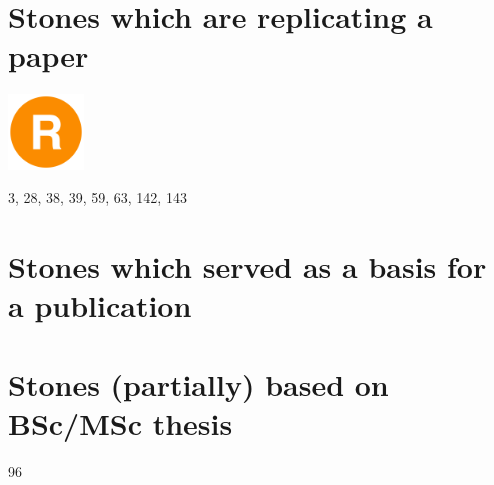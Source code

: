 \documentclass[a4paper,11pt]{report}
\begin{document}
\section{
Stones which are replicating a paper}

\includegraphics[width=2cm]{images/R}

3, 28, 38, 39, 59, 63, 142, 143

\section{
Stones which served as a basis for a publication}



\section{
Stones (partially) based on BSc/MSc thesis}

96






\printbibliography
\end{document}

